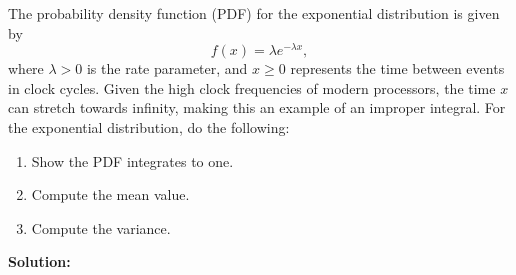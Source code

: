 \begin{example}
The probability density function (PDF) for the exponential distribution is given by
\[ f(x) = \lambda e^{-\lambda x}, \]
where \(\lambda > 0\) is the rate parameter, and \(x \ge 0\) represents the time between events in clock cycles. Given the high clock frequencies of modern processors, the time \(x\) can stretch towards infinity, making this an example of an improper integral. For the exponential distribution, do the following:
\begin{enumerate}
\renewcommand{\labelenumi}{(\alph{enumi})}
\setlength{\itemsep}{.2cm}
    \item Show the PDF integrates to one.
    \item Compute the mean value.
    \item Compute the variance.
\end{enumerate}
\end{example}

\textbf{Solution:}

